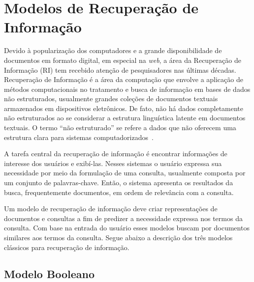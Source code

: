 
\section{Modelos de Recuperação de Informação}


Devido à popularização dos computadores e a grande disponibilidade de documentos em formato digital, em especial na \textit{web}, a área da Recuperação de Informação (RI) tem recebido atenção de pesquisadores nas últimas décadas. Recuperação de Informação é a área da computação que envolve a aplicação de métodos computacionais no tratamento e busca de informação em bases de dados não estruturados, usualmente grandes coleções de documentos textuais armazenados em dispositivos eletrônicos. De fato, não há dados completamente não estruturados ao se considerar a estrutura linguística latente em documentos textuais. O termo ``não estruturado'' se refere a dados que não oferecem uma estrutura clara para sistemas computadorizados~\cite{Manning2008}.


A tarefa central da recuperação de informação é encontrar informações de interesse dos usuários e exibí-las. 
Nesses sistemas o usuário expressa sua necessidade por meio da formulação de uma consulta, usualmente composta por um conjunto de palavras-chave. Então, o sistema apresenta os resultados da busca, frequentemente documentos, em ordem de relevância com a consulta.  %



Um modelo de recuperação de informação deve criar representações de documentos e consultas a fim de predizer a necessidade expressa nos termos da consulta. Com base na entrada do usuário esses modelos buscam por documentos similares aos termos da consulta. Segue abaixo a descrição dos três modelos clássicos para recuperação de informação.

\subsection{Modelo Booleano}

